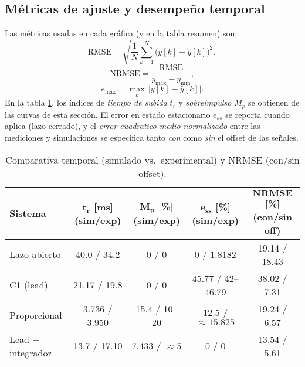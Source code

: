\subsection{Métricas de ajuste y desempeño temporal}
Las métricas usadas en cada gráfica (y en la tabla resumen) son:
\begin{equation}
	\label{eq:rmse_temporal}
	\mathrm{RMSE}=\sqrt{\frac{1}{N}\sum_{k=1}^{N}\big(y[k]-\hat{y}[k]\big)^2},
\end{equation}
\begin{equation}
	\label{eq:rmse_porct}
	\mathrm{NRMSE}=\frac{\mathrm{RMSE}}{y_{\max}-y_{\min}},
\end{equation}
\begin{equation}
	\label{eq:emax_temporal}
	e_{\max}=\max_k\,\lvert y[k]-\hat{y}[k]\rvert.
\end{equation}
\balance
En la tabla \ref{tab:comparativa_temporal_min}, los índices de \emph{tiempo de subida} \(t_r\) y \emph{sobreimpulso} \(M_p\) se obtienen de las curvas de esta sección. El error en estado estacionario \(e_{ss}\) se reporta cuando aplica (lazo cerrado), y el \emph{error cuadratico medio normalizado} entre las mediciones y simulaciones se especifica tanto \emph{con} como \emph{sin} el offset de las señales.

\begin{table}[t]
	\centering
	\caption{Comparativa temporal (simulado vs.\ experimental) y NRMSE (con/sin offset).}
	\label{tab:comparativa_temporal_min}
	\small
	\setlength{\tabcolsep}{4pt}
	\renewcommand{\arraystretch}{1.1}
	\begin{adjustbox}{max width=\columnwidth}
		\begin{tabular}{lcccc}
			\toprule
			\textbf{Sistema} &
			\makecell{\(\mathbf{t_r}\) [ms]\\(sim/exp)} &
			\makecell{\(\mathbf{M_p}\) [\%]\\(sim/exp)} &
			\makecell{\(\mathbf{e_{ss}}\) [\%]\\(sim/exp)} &
			\makecell{\(\mathbf{NRMSE}\) [\%]\\(con/sin off)}\\
			\midrule
			Lazo abierto       & 40.0 / 34.2   & 0 / 0                 & 0 / 1.8182             & 19.14 / 18.43 \\
			C1 (lead)          & 21.17 / 19.8  & 0 / 0                 & 45.77 / 42--46.79      & 38.02 / 7.31 \\
			Proporcional       & 3.736 / 3.950 & 15.4 / 10--20         & 12.5 / \(\approx 15.825\) & 19.24 / 6.57 \\
			Lead + integrador  & 13.7 / 17.10  & 7.433 / \(\approx 5\) & 0 / 0                  & 13.54 / 5.61 \\
			\bottomrule
		\end{tabular}
	\end{adjustbox}
\end{table}

